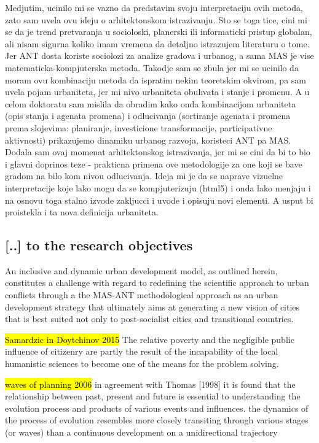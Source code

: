 \documentclass[11pt]{report}
\begin{document}
Medjutim, ucinilo mi se vazno da predstavim svoju interpretaciju ovih metoda, zato sam uvela ovu ideju o arhitektonskom istrazivanju. Sto se toga tice, cini mi se da je trend pretvaranja u socioloski, planerski ili informaticki pristup globalan, ali nisam sigurna koliko imam vremena da detaljno istrazujem literaturu o tome. Jer ANT dosta koriste sociolozi za analize gradova i urbanog, a sama MAS je vise matematicka-kompjuterska metoda. Takodje sam se zbula jer mi se ucinilo da moram ovu kombinaciju metoda da ispratim nekim teoretskim okvirom, pa sam uvela pojam urbaniteta, jer mi nivo urbaniteta obuhvata i stanje i promenu. A u celom doktoratu sam mislila da obradim kako onda kombinacijom urbaniteta (opis stanja i agenata promena) i odlucivanja (sortiranje agenata i promena prema slojevima: planiranje, investicione transformacije, participativne aktivnosti) prikazujemo dinamiku urbanog razvoja, koristeci  ANT pa MAS. Dodala sam ovaj momenat arhitektonskog istrazivanja, jer mi se cini da bi to bio i glavni doprinos teze - prakticna primena ove metodologije za one koji se bave gradom na bilo kom nivou odlucivanja. Ideja mi je da se naprave vizuelne interpretacije koje lako mogu da se kompjuterizuju (html5) i onda lako menjaju i na osnovu toga stalno izvode zakljucci i uvode i opisuju novi elementi.
A usput bi proistekla i ta nova definicija urbaniteta.

\subsection{[..] to the research objectives}

An inclusive and dynamic urban development model, as outlined herein, constitutes a challenge with regard to redefining the scientific approach to urban conflicts through a the MAS-ANT methodological approach as an urban development strategy that ultimately aims at generating a new vision of cities that is best suited not only to post-socialist cities and transitional countries.

\hl{Samardzic in Doytchinov 2015} 
The relative poverty and the negligible public influence of citizenry are partly the result of the incapability of the local
humanistic  sciences  to  become  one  of  the  means  for  the  problem  solving. 

\hl{waves of planning 2006}
in  agreement  with  Thomas [1998] it is found that the relationship between past, present and future is essential to understanding  the  evolution  process  and  products  of  various  events  and  influences.
the dynamics of the process  of  evolution  resembles  more  closely  transiting  through  various  stages  (or  waves)
than a continuous development on a unidirectional trajectory
\end{document}

